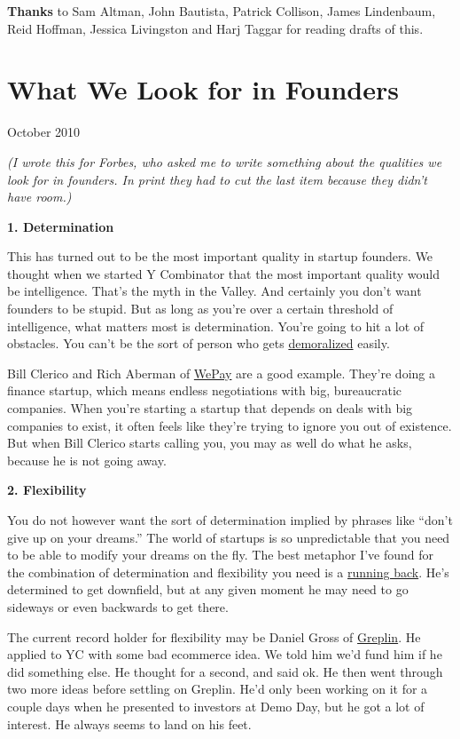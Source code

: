 \documentclass[12pt]{book}
\begin{document}
\textbf{Thanks} to Sam Altman, John Bautista, Patrick Collison, James
Lindenbaum, Reid Hoffman, Jessica Livingston and Harj Taggar for reading
drafts of this.
\chapter{What We Look for in Founders}

October 2010

\emph{(I wrote this for Forbes, who asked me to write something about
the qualities we look for in founders. In print they had to cut the last
item because they didn't have room.)}

\textbf{1. Determination}

This has turned out to be the most important quality in startup
founders. We thought when we started Y Combinator that the most
important quality would be intelligence. That's the myth in the Valley.
And certainly you don't want founders to be stupid. But as long as
you're over a certain threshold of intelligence, what matters most is
determination. You're going to hit a lot of obstacles. You can't be the
sort of person who gets \href{die.html}{demoralized} easily.

Bill Clerico and Rich Aberman of \href{http://wepay.com}{WePay} are a
good example. They're doing a finance startup, which means endless
negotiations with big, bureaucratic companies. When you're starting a
startup that depends on deals with big companies to exist, it often
feels like they're trying to ignore you out of existence. But when Bill
Clerico starts calling you, you may as well do what he asks, because he
is not going away.

\textbf{2. Flexibility}

You do not however want the sort of determination implied by phrases
like ``don't give up on your dreams.'' The world of startups is so
unpredictable that you need to be able to modify your dreams on the fly.
The best metaphor I've found for the combination of determination and
flexibility you need is a \href{relres.html}{running back}. He's
determined to get downfield, but at any given moment he may need to go
sideways or even backwards to get there.

The current record holder for flexibility may be Daniel Gross of
\href{http://greplin.com}{Greplin}. He applied to YC with some bad
ecommerce idea. We told him we'd fund him if he did something else. He
thought for a second, and said ok. He then went through two more ideas
before settling on Greplin. He'd only been working on it for a couple
days when he presented to investors at Demo Day, but he got a lot of
interest. He always seems to land on his feet.
\end{document}
